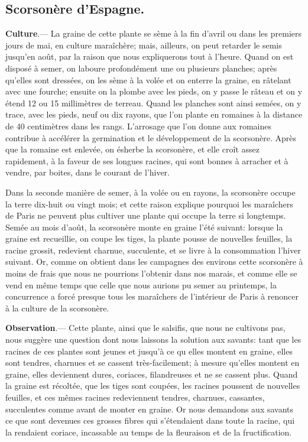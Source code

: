 \documentclass[10pt,a4paper]{book}
\begin{document}
\subsection{Scorsonère d’Espagne.}

\textbf{Culture}.--- La graine de cette plante se sème à la fin d'avril ou dans les premiers jours de mai, en culture maraîchère; mais, ailleurs, on peut retarder le semis jusqu'en août, par la raison que nous expliquerons tout à l'heure. Quand on est disposé à semer, on laboure profondément une ou plusieurs planches; après qu'elles sont dressées, on les sème à la volée et on enterre la graine, en râtelant avec une fourche; ensuite on la plombe avec les pieds, on y passe le râteau et on y étend 12 ou 15 millimètres de terreau. Quand les planches sont ainsi semées, on y trace, avec les pieds, neuf ou dix rayons, que l'on plante en romaines à la distance de 40 centimètres dans les rangs. L'arrosage que l'on donne aux romaines contribue à accélérer la germination et le développement de la scorsonère. Après que la romaine est enlevée, on ésherbe la scorsonère, et elle croît assez rapidement, à la faveur de ses longues racines, qui sont bonnes à arracher et à vendre, par boites, dans le courant de l'hiver.

Dans la seconde manière de semer, à la volée ou en rayons, la scorsonère occupe la terre dix-huit ou vingt mois; et cette raison explique pourquoi les maraîchers de Paris ne peuvent plus cultiver une plante qui occupe la terre si longtemps. Semée au mois d'août, la scorsonère monte en graine l'été suivant: lorsque la graine est recueillie, on coupe les tiges, la plante pousse de nouvelles feuilles, la racine grossit, redevient charnue, succulente, et se livre à la consommation l'hiver suivant. Or, comme on obtient dans les campagnes des environs cette scorsonère à moins de frais que nous ne pourrions l'obtenir dans nos marais, et comme elle se vend en même temps que celle que nous aurions pu semer au printemps, la concurrence a forcé presque tous les maraîchers de l'intérieur de Paris à renoncer à la culture de la scorsonère.

{\small \textbf{Observation}.--- Cette plante, ainsi que le salsifis, que nous ne cultivons pas, nous suggère une question dont nous laissons la solution aux savants: tant que les racines de ces plantes sont jeunes et jusqu'à ce qu elles montent en graine, elles sont tendres, charnues et se cassent très-facilement; à mesure qu'elles montent en graine, elles deviennent dures, coriaces, filandreuses et ne se cassent plus. Quand la graine est récoltée, que les tiges sont coupées, les racines poussent de nouvelles feuilles, et ces mêmes racines redeviennent tendres, charnues, cassantes, succulentes comme avant de monter en graine. Or nous demandons aux savants ce que sont devenues ces grosses fibres qui s'étendaient dans toute la racine, qui la rendaient coriace, incassable au temps de la fleuraison et de la fructification.}
\end{document}
